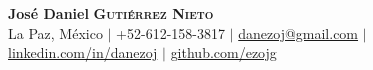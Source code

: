 
\begin{center}
    {\LARGE 
    \textbf{José Daniel}
    \textbf{\scshape Gutiérrez Nieto}
    }
    \\ \vspace{1ex}
    La Paz, México $|$ 
    +52-612-158-3817 $|$ 
    \href{mailto:danezoj@gmail.com}{danezoj@gmail.com} $|$ 
    \href{https://linkedin.com/in/danezoj/}{linkedin.com/in/danezoj} $|$
    \href{https://github.com/ezojg/}{github.com/ezojg}
\end{center}
